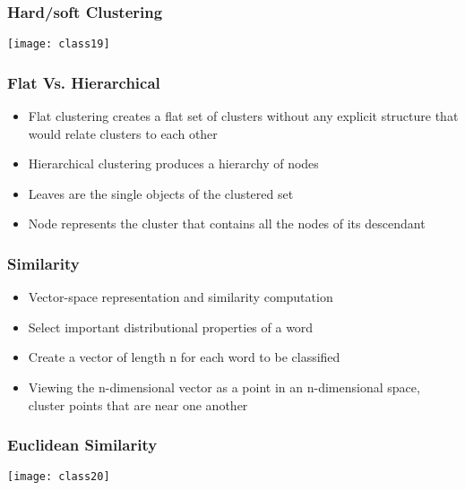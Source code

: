 \begin{frame}[fragile]
  \frametitle{Hard/soft Clustering}
\begin{center}
\texttt{[image: class19]}
\end{center}
\end{frame}


\begin{frame}[fragile]
  \frametitle{Flat Vs. Hierarchical }
\begin{itemize}
\item Flat clustering creates a flat set of clusters without any explicit structure that would relate clusters to each other
\item Hierarchical clustering produces a hierarchy of nodes	
\item Leaves are the single objects  of the clustered set
\item Node represents the cluster that contains all the nodes of its descendant
\end{itemize}
\end{frame}

\begin{frame}[fragile]
  \frametitle{Similarity}
\begin{itemize}
\item Vector-space representation and similarity computation
\item Select important distributional properties of a word
\item Create a vector of length n for each word to be classified
\item Viewing the n-dimensional vector as a point in an n-dimensional space, cluster points that are near one another

\end{itemize}
\end{frame}

\begin{frame}[fragile]
  \frametitle{Euclidean Similarity}
\begin{center}
\texttt{[image: class20]}
\end{center}
\end{frame}

